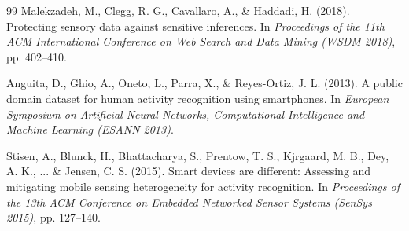 \begin{thebibliography}{99}
Malekzadeh, M., Clegg, R. G., Cavallaro, A., \& Haddadi, H. (2018). 
Protecting sensory data against sensitive inferences. 
In \textit{Proceedings of the 11th ACM International Conference on Web Search and Data Mining (WSDM 2018)}, pp. 402--410.

Anguita, D., Ghio, A., Oneto, L., Parra, X., \& Reyes-Ortiz, J. L. (2013). 
A public domain dataset for human activity recognition using smartphones. 
In \textit{European Symposium on Artificial Neural Networks, Computational Intelligence and Machine Learning (ESANN 2013)}.

Stisen, A., Blunck, H., Bhattacharya, S., Prentow, T. S., Kjrgaard, M. B., Dey, A. K., ... \& Jensen, C. S. (2015).
Smart devices are different: Assessing and mitigating mobile sensing heterogeneity for activity recognition. 
In \textit{Proceedings of the 13th ACM Conference on Embedded Networked Sensor Systems (SenSys 2015)}, pp. 127--140.

\end{thebibliography}
